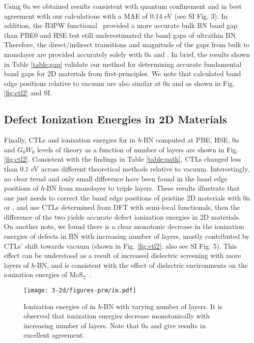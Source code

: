 Using \p0a we obtained results consistent with quantum confinement and in best agreement with our \gw calculations with a MAE of 0.14 eV (see SI Fig. 3). In addition, the B3PW functional~\cite{becke1993density,crowley2016resolution} provided a more accurate bulk BN band gap than PBE0 and HSE but still underestimated the band gaps of ultrathin BN. Therefore, the direct/indirect transitions and magnitude of the gaps from bulk to monolayer are provided accurately solely with \p0a and \gwns.
In brief, the results shown in Table \ref{table:gap} validate our method for determining accurate fundamental band gaps for 2D materials from first-principles. We note that calculated band edge positions relative to vacuum are also similar at \p0a and \gw as shown in Fig. \ref{fig:ctl2} and SI.



\subsection{Defect Ionization Energies in 2D Materials}
Finally, CTLs and ionization energies for \cb in \textit{h}-BN computed at PBE, HSE, \p0a and $G_0W_0$ levels of theory as a function of number of layers are shown in Fig. \ref{fig:ctl2}. Consistent with the findings in Table \ref{table:path}, CTLs changed less than 0.1 eV across different theoretical methods relative to vacuum. Interestingly, no clear trend and only small difference have been found in the band edge positions of \textit{h}-BN from monolayer to triple layers. These results illustrate that one just needs to correct the band edge positions of pristine 2D materials with \p0a or \gwns , and use CTLs determined from DFT with semi-local functionals, then the difference of the two yields accurate defect ionization energies in 2D materials. On another note, we found there is a clear monotonic decrease in the ionization energies of defects in BN with increasing number of layers, mostly contributed by CTLs' shift towards vacuum (shown in Fig. \ref{fig:ctl2}; also see SI Fig. 5). This effect can be understood as a result of increased dielectric screening with more layers of \textit{h}-BN, and is consistent with the effect of dielectric environments on the ionization energies of MoS$_2$~\cite{noh2015deep}.

\begin{figure}[t]
\begin{center}
\texttt{[image: 3-2d/figures-prm/ie.pdf]}
\caption{Ionization energies of \cb in \textit{h}-BN with varying number of layers. It is observed that ionization energies decrease monotonically with increasing number of layers. Note that \p0a and \gw give results in excellent agreement.} \label{fig:ie}
\end{center}
\end{figure}

